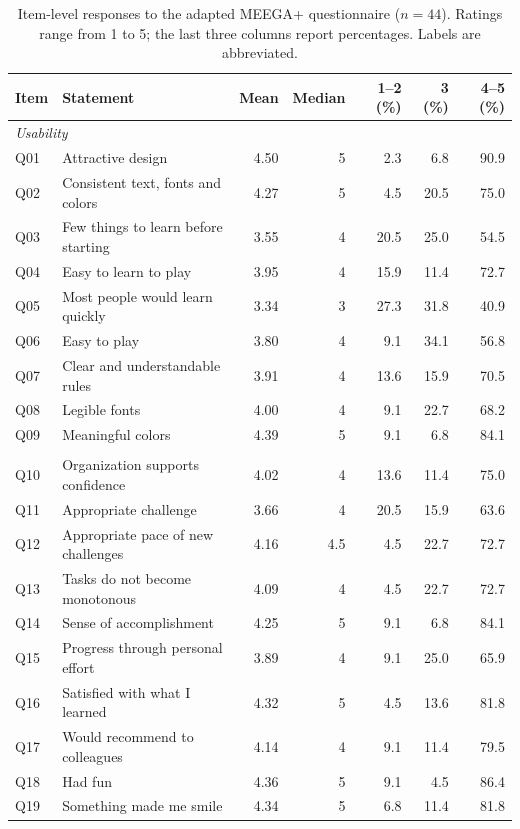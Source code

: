 \begin{table}[htbp]
\centering
\small
\caption{Item-level responses to the adapted MEEGA+ questionnaire ($n=44$). Ratings range from 1 to 5; the last three columns report percentages. Labels are abbreviated.}
\label{tab:meega-items}
\begin{tabular}{llrrrrr}
\toprule
Item & Statement & Mean & Median & 1--2 (\%) & 3 (\%) & 4--5 (\%) \\
\midrule
\multicolumn{7}{l}{\textit{Usability}} \\
Q01 & Attractive design & 4.50 & 5 & 2.3 & 6.8 & 90.9 \\
Q02 & Consistent text, fonts and colors & 4.27 & 5 & 4.5 & 20.5 & 75.0 \\
Q03 & Few things to learn before starting & 3.55 & 4 & 20.5 & 25.0 & 54.5 \\
Q04 & Easy to learn to play & 3.95 & 4 & 15.9 & 11.4 & 72.7 \\
Q05 & Most people would learn quickly & 3.34 & 3 & 27.3 & 31.8 & 40.9 \\
Q06 & Easy to play & 3.80 & 4 & 9.1 & 34.1 & 56.8 \\
Q07 & Clear and understandable rules & 3.91 & 4 & 13.6 & 15.9 & 70.5 \\
Q08 & Legible fonts & 4.00 & 4 & 9.1 & 22.7 & 68.2 \\
Q09 & Meaningful colors & 4.39 & 5 & 9.1 & 6.8 & 84.1 \\
\addlinespace
\multicolumn{7}{l}{\textit{Player experience}} \\
Q10 & Organization supports confidence & 4.02 & 4 & 13.6 & 11.4 & 75.0 \\
Q11 & Appropriate challenge & 3.66 & 4 & 20.5 & 15.9 & 63.6 \\
Q12 & Appropriate pace of new challenges & 4.16 & 4.5 & 4.5 & 22.7 & 72.7 \\
Q13 & Tasks do not become monotonous & 4.09 & 4 & 4.5 & 22.7 & 72.7 \\
Q14 & Sense of accomplishment & 4.25 & 5 & 9.1 & 6.8 & 84.1 \\
Q15 & Progress through personal effort & 3.89 & 4 & 9.1 & 25.0 & 65.9 \\
Q16 & Satisfied with what I learned & 4.32 & 5 & 4.5 & 13.6 & 81.8 \\
Q17 & Would recommend to colleagues & 4.14 & 4 & 9.1 & 11.4 & 79.5 \\
Q18 & Had fun & 4.36 & 5 & 9.1 & 4.5 & 86.4 \\
Q19 & Something made me smile & 4.34 & 5 & 6.8 & 11.4 & 81.8 \\

\end{tabular}
\end{table}
